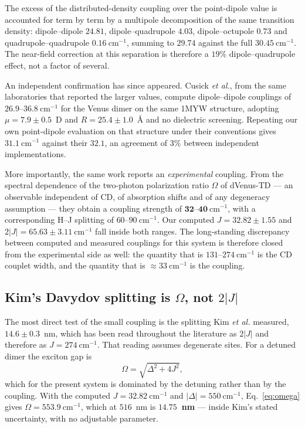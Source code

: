 \documentclass[journal=jpcbfk, manuscript=article, layout=twocolumn, doi=true]{achemso}
\begin{document}
The excess of the distributed-density coupling over the point-dipole value is
accounted for term by term by a multipole decomposition of the same transition
density: dipole--dipole $24.81$, dipole--quadrupole $4.03$,
dipole--octupole $0.73$ and quadrupole--quadrupole $0.16~\mathrm{cm^{-1}}$,
summing to $29.74$ against the full $30.45~\mathrm{cm^{-1}}$. The near-field
correction at this separation is therefore a $19\%$ dipole--quadrupole effect,
not a factor of several.

An independent confirmation has since appeared. Cusick \emph{et
al.}\cite{cusick2026twophoton}, from the same laboratories that reported the
larger values, compute dipole--dipole couplings of $26.9$--$36.8~\mathrm{cm^{-1}}$
for the Venus dimer on the same 1MYW structure, adopting
$\mu = 7.9 \pm 0.5$~D and $R = 25.4 \pm 1.0$~\AA{} and no dielectric screening.
Repeating our own point-dipole evaluation on that structure under their
conventions gives $31.1~\mathrm{cm^{-1}}$ against their $32.1$, an agreement of
$3\%$ between independent implementations.

More importantly, the same work reports an \emph{experimental} coupling. From
the spectral dependence of the two-photon polarization ratio $\Omega$ of
dVenus-TD --- an observable independent of CD, of absorption shifts and of any
degeneracy assumption --- they obtain a coupling strength of
$\bm{32}$--$\bm{40~\mathrm{cm^{-1}}}$, with a corresponding H--J splitting of
$60$--$90~\mathrm{cm^{-1}}$. Our computed $J = 32.82 \pm 1.55$ and
$2|J| = 65.63 \pm 3.11~\mathrm{cm^{-1}}$ fall inside both ranges. The
long-standing discrepancy between computed and measured couplings for this
system is therefore closed from the experimental side as well: the quantity that
is $131$--$274~\mathrm{cm^{-1}}$ is the CD couplet width, and the quantity that
is $\approx 33~\mathrm{cm^{-1}}$ is the coupling.

\subsection{Kim's Davydov splitting is $\Omega$, not $2|J|$}
\label{sec:omega}

The most direct test of the small coupling is the splitting Kim
\emph{et al.}\cite{kim2019venusa206} measured, $14.6 \pm 0.3$~nm, which has
been read throughout the literature as $2|J|$ and therefore as
$J = 274~\mathrm{cm^{-1}}$. That reading assumes degenerate sites. For a
detuned dimer the exciton gap is
\begin{equation}
\Omega = \sqrt{\Delta^{2} + 4J^{2}},
\label{eq:omega}
\end{equation}
which for the present system is dominated by the detuning rather than by the
coupling. With the computed $J = 32.82~\mathrm{cm^{-1}}$ and
$|\Delta| = 550~\mathrm{cm^{-1}}$, Eq.~\eqref{eq:omega} gives
$\Omega = 553.9~\mathrm{cm^{-1}}$, which at $516$~nm is
\textbf{$14.75$~nm} --- inside Kim's stated uncertainty, with no adjustable
parameter.
\end{document}
